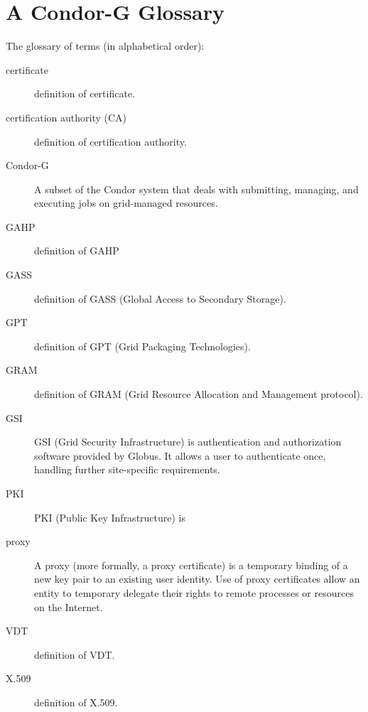 \section{A Condor-G Glossary}\label{sec:Condor-G-Glossary}

The glossary of terms (in alphabetical order):

\begin{description} 

\item[certificate] definition of certificate.

\item[certification authority (CA)] definition of certification authority.

\item[Condor-G]
A subset of the Condor system that deals with
submitting, managing, and executing jobs on grid-managed resources.

\item[GAHP] definition of GAHP

\item[GASS] definition of GASS (Global Access to Secondary Storage).

\item[GPT] definition of GPT (Grid Packaging Technologies).

\item[GRAM] definition of GRAM (Grid Resource Allocation and Management
protocol).

\item[GSI] GSI (Grid Security Infrastructure) is 
authentication and authorization software provided by Globus.
It allows a user to authenticate once,
handling further site-specific requirements.

\item[PKI] PKI (Public Key Infrastructure) is 

\item[proxy] A proxy (more formally, a proxy certificate) is
a temporary binding of a new key pair to an existing user identity.
Use of proxy certificates allow an entity to temporary delegate
their rights to remote processes or resources on the Internet. 


\item[VDT] definition of VDT.

\item[X.509] definition of X.509.

\end{description} 

